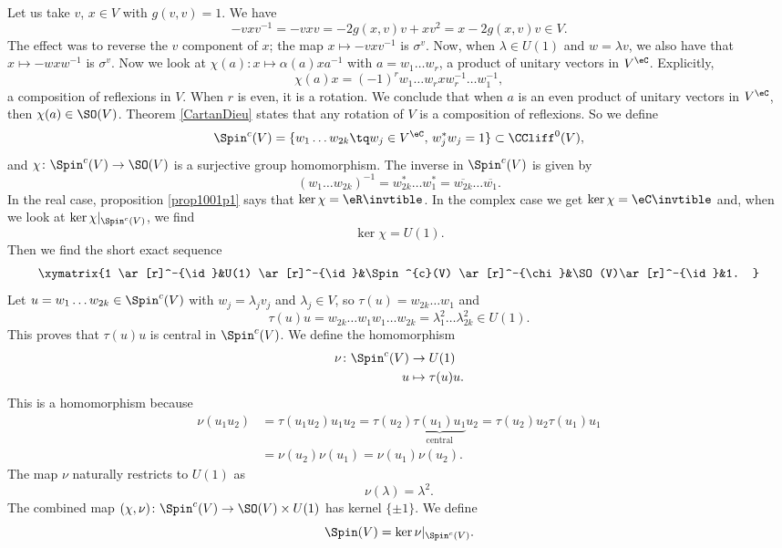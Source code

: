 Let us take $v$, $x\in V$ with $g(v,v)=1$. We have 
\[ 
  -vxv^{-1}=-vxv=-2g(x,v)v+xv^2
		=x-2g(x,v)v\in V.
\]
The effect was to reverse the $v$ component of $x$; the map $x\mapsto -vxv^{-1}$ is $\sigma^v$. Now, when $\lambda\in U(1)$ and $w=\lambda v$, we also have that $x\mapsto -wxw^{-1}$ is $\sigma^v$. Now we look at $\chi(a)\colon x\mapsto \alpha(a)xa^{-1}$ with $a=w_{1}\ldots w_{r}$, a product of unitary vectors in $V^{\eC}$. Explicitly,
\[ 
  \chi(a)x=(-1)^{r} w_{1}\ldots w_{r}xw_{r}^{-1}\ldots w_{1}^{-1},
\]
a composition of reflexions in $V$. When $r$ is even, it is a rotation. We conclude that when $a$ is an even product of unitary vectors in $V^{\eC}$, then $\chi(a)\in \SO(V)$. Theorem \ref{CartanDieu} states that any rotation of $V$ is a composition of reflexions. So we define
\begin{equation}
\Spin^{c}(V)=\{ w_{1}\ldots w_{2k}\tq w_{j}\in V^{\eC},\,w_{j}^*w_{j}=1 \}\subset \CCliff^{0}(V),
\end{equation}
and $\chi\colon \Spin^{c}(V)\to \SO(V)$ is a surjective group homomorphism. The inverse in $\Spin^{c}(V)$ is given by
\[ 
  (w_{1}\ldots w_{2k})^{-1}=w_{2k}^*\ldots w_{1}^*=\overline{ w_{2k} }\ldots\overline{ w_{1} }.
\]
In the real case, proposition \ref{prop1001p1} says that $\ker\chi=\eR\invtible$. In the complex case we get  $\ker\chi=\eC\invtible$ and, when we look at $\ker\chi|_{\Spin^{c}(V)}$, we find
\begin{equation}
\ker\chi=U(1).
\end{equation}
Then we find the short exact sequence 
\begin{equation}
\xymatrix{%
   1 \ar[r]^-{\id}&U(1) \ar[r]^-{\id}&\Spin^{c}(V) \ar[r]^-{\chi}&\SO(V)\ar[r]^-{\id}&1.
}
\end{equation}
Let $u=w_{1}\ldots w_{2k}\in\Spin^{c}(V)$ with $w_{j}=\lambda_{j}v_{j}$ and $\lambda_{j}\in V$, so $\tau(u)=w_{2k}\ldots w_{1}$ and
\[ 
  \tau(u)u=w_{2k}\ldots w_{1}w_{1}\ldots w_{2k}
		=\lambda_{1}^{2}\ldots \lambda_{2k}^{2}\in U(1).
\]
This proves that $\tau(u)u$ is central in $\Spin^{c}(V)$. We define the homomorphism
\begin{equation}
\begin{aligned}
\nu \colon \Spin^{c}(V)&\to U(1) \\ 
u&\mapsto \tau(u)u. 
\end{aligned}
\end{equation}
This is a homomorphism because
\[ 
\begin{split}
  \nu(u_{1}u_{2})&=\tau(u_{1}u_{2})u_{1}u_{2}
		=\tau(u_{2})\underbrace{\tau(u_{1})u_{1}}_{\text{central}}u_{2}
		=\tau(u_{2})u_{2}\tau(u_{1})u_{1}\\
		&=\nu(u_{2})\nu(u_{1})
		=\nu(u_{1})\nu(u_{2}).
\end{split}  
\]
The map $\nu$ naturally restricts to $U(1)$ as
\[ 
  \nu(\lambda)=\lambda^{2}.
\]
The combined map $(\chi,\nu)\colon \Spin^{c}(V)\to \SO(V)\times U(1)$ has kernel $\{ \pm 1 \}$. We define
\begin{equation}  \label{eq_defSpindeux}
\Spin(V)=\ker\nu|_{\Spin^{c}(V)}.
\end{equation}

